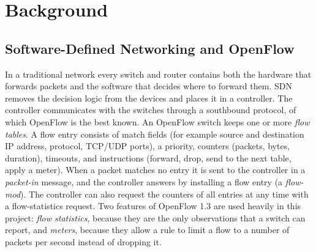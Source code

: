 \section{Background}

\subsection{Software-Defined Networking and OpenFlow}
In a traditional network every switch and router contains both the hardware that forwards packets and the software that decides where to forward them. SDN removes the decision logic from the devices and places it in a controller. The controller communicates with the switches through a southbound protocol, of which OpenFlow \cite{bib:openflow} is the best known. An OpenFlow switch keeps one or more \emph{flow tables}. A flow entry consists of match fields (for example source and destination IP address, protocol, TCP/UDP ports), a priority, counters (packets, bytes, duration), timeouts, and instructions (forward, drop, send to the next table, apply a meter). When a packet matches no entry it is sent to the controller in a \emph{packet-in} message, and the controller answers by installing a flow entry (a \emph{flow-mod}). The controller can also request the counters of all entries at any time with a flow-statistics request. Two features of OpenFlow 1.3 are used heavily in this project: \emph{flow statistics}, because they are the only observations that a switch can report, and \emph{meters}, because they allow a rule to limit a flow to a number of packets per second instead of dropping it.

